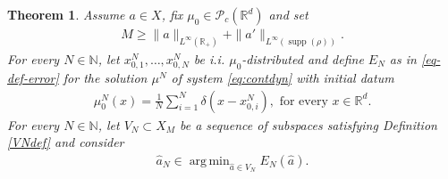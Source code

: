 \documentclass[A4paper,11pt]{article}
\newtheorem{theorem}{Theorem}[section]
\theoremstyle{definition}
\newcommand{\N}{\mathbb{N}}
\newcommand{\R}{\mathbb{R}}
\DeclareMathOperator{\supp}{supp}
\DeclareMathOperator{\argmin}{arg\,min}
\begin{document}
\begin{theorem}\label{thm}
	Assume $a\in X$, fix $\mu_0 \in \mathcal{P}_c(\R^d)$ and set
	\begin{align*}
	M \geq \|a\|_{L^{\infty}(\R_+)} + \|a'\|_{L^{\infty}(\supp(\rho))}.
	\end{align*}
	For every $N \in \N$, let $x^N_{0,1},\ldots,x^N_{0,N}$ be i.i. $\mu_0$-distributed and define $E_N$ as in \eqref{eq-def-error} for the solution $\mu^N$ of system \eqref{eq:contdyn} with initial datum
	\begin{align*}
	\mu^{N}_0(x) = \frac{1}{N}\sum^N_{i = 1} \delta(x - x^{N}_{0,i}), \text{ for every } x \in \R^d.
	\end{align*}
	For every $N \in \N$, let $V_N\subset X_M$ be a sequence of subspaces satisfying Definition \ref{VNdef} and consider
	\begin{align*}
		\widehat a_N\in\argmin_{\widehat a\in V_N}E_N(\widehat a).
	\end{align*}
	

\end{theorem}
\end{document}

